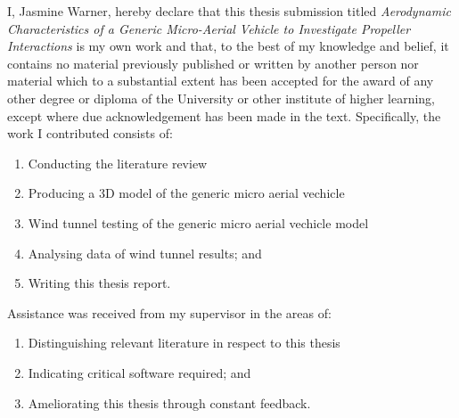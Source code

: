 
\begin{declaration}
I, Jasmine Warner, hereby declare that this thesis submission titled \emph{Aerodynamic Characteristics of a Generic Micro-Aerial Vehicle to Investigate Propeller Interactions} is my own work and that, to the best of my knowledge and belief, it contains no material previously published or written by another person nor material which to a substantial extent has been accepted for the award of any other degree or diploma of the University or other institute of higher learning, except where due acknowledgement has been made in the text.  Specifically, the work I contributed consists of:

\vspace{-1em}

\begin{enumerate}
    \item Conducting the literature review
    \item Producing a 3D model of the generic micro aerial vechicle
    \item Wind tunnel testing of the generic micro aerial vechicle model
    \item Analysing data of wind tunnel results; and
    \item Writing this thesis report.
\end{enumerate}

\vspace{-1em}

Assistance was received from my supervisor in the areas of:

\vspace{-1em}

\begin{enumerate}
    \item Distinguishing relevant literature in respect to this thesis
    \item Indicating critical software required; and
    \item Ameliorating this thesis through constant feedback.
\end{enumerate}

\vspace{0.5cm}


\end{declaration}
